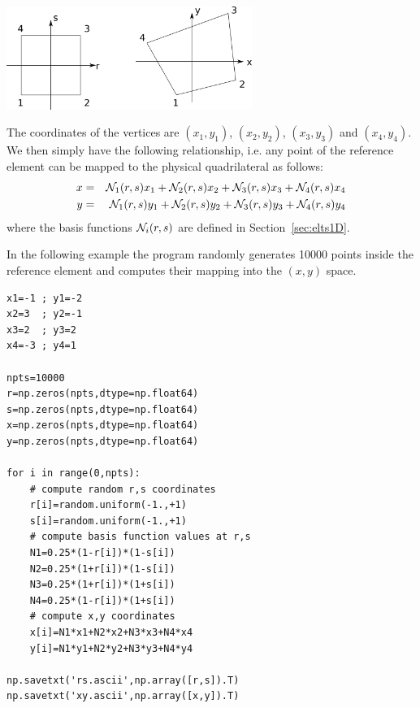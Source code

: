 \begin{center}
\includegraphics[width=8cm]{images/mappings/bilinear/mapping_bilinear.png}
\end{center}

The coordinates of the vertices are 
$(x_1,y_1)$, $(x_2,y_2)$, $(x_3,y_3)$ and $(x_4,y_4)$.
We then simply have the 
following relationship, i.e. any point of the reference element 
can be mapped to the physical quadrilateral as follows:
\begin{eqnarray}
x&=& {\mathcal{N}}_1(r,s) x_1 + {\mathcal{N}}_2(r,s) x_2 + {\mathcal{N}}_3(r,s) x_3 + {\mathcal{N}}_4(r,s) x_4 \\
y&=& {\mathcal{N}}_1(r,s) y_1 + {\mathcal{N}}_2(r,s) y_2 + {\mathcal{N}}_3(r,s) y_3 + {\mathcal{N}}_4(r,s) y_4 
\end{eqnarray} 
where the basis functions ${\mathcal{N}}_i(r,s)$ are defined in Section~\ref{sec:elts1D}.

In the following example the program randomly generates 10000 points inside the reference 
element and computes their mapping into the $(x,y)$ space. 

\begin{lstlisting}
x1=-1 ; y1=-2
x2=3  ; y2=-1
x3=2  ; y3=2
x4=-3 ; y4=1

npts=10000
r=np.zeros(npts,dtype=np.float64)   
s=np.zeros(npts,dtype=np.float64)   
x=np.zeros(npts,dtype=np.float64)   
y=np.zeros(npts,dtype=np.float64)   

for i in range(0,npts):
    # compute random r,s coordinates
    r[i]=random.uniform(-1.,+1)
    s[i]=random.uniform(-1.,+1)
    # compute basis function values at r,s
    N1=0.25*(1-r[i])*(1-s[i])
    N2=0.25*(1+r[i])*(1-s[i])
    N3=0.25*(1+r[i])*(1+s[i])
    N4=0.25*(1-r[i])*(1+s[i])
    # compute x,y coordinates
    x[i]=N1*x1+N2*x2+N3*x3+N4*x4
    y[i]=N1*y1+N2*y2+N3*y3+N4*y4

np.savetxt('rs.ascii',np.array([r,s]).T)
np.savetxt('xy.ascii',np.array([x,y]).T)
\end{lstlisting}

